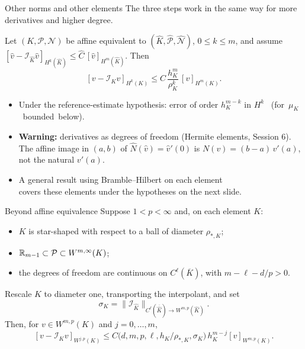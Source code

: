 \begin{frame}{Other norms and other elements}
    \small
    The three steps work in the same way for more derivatives and higher degree.
    \begin{theorem}
        Let $(K,\mathcal P,\mathcal N)$ be affine equivalent to $(\widehat K,\widehat{\mathcal P},\widehat{\mathcal N})$, $0 \le k \le m$, and assume
        $[\widehat v - \mathcal I_{\widehat K}\widehat v]_{H^k(\widehat K)} \le \widehat C\, [\widehat v]_{H^m(\widehat K)}$. Then
        \[
            [v - \mathcal I_K v]_{H^k(K)} \le C\, \frac{h_K^m}{\rho_K^k}\, [v]_{H^m(K)} .
        \]
    \end{theorem}
    \begin{itemize}
        \item Under the reference-estimate hypothesis: error of order $h_K^{m-k}$ in $H^k$ \ \mbox{(for $\mu_K$ bounded below).}
        \item \textbf{Warning:} derivatives as degrees of freedom (Hermite elements, Session 6).\\ The affine image in $(a,b)$ of $\widehat N(\widehat v) = \widehat v'(0)$ is
              $N(v) = (b-a)\, v'(a)$, not the natural $v'(a)$.
        \item A general result using Bramble--Hilbert on each element\\ covers these elements under the hypotheses on the next slide.
    \end{itemize}
\end{frame}

\begin{frame}{Beyond affine equivalence}
    \small
    Suppose $1<p<\infty$ and, on each element $K$:
    \begin{itemize}
        \item $K$ is star-shaped with respect to a ball of diameter $\rho_{*,K}$;
        \item ${\mathbb R}_{m-1} \subset \mathcal P \subset W^{m,\infty}(K)$;
        \item the degrees of freedom are continuous on $C^\ell(\overline K)$, with $m-\ell-d/p>0$.
    \end{itemize}
    Rescale $K$ to diameter one, transporting the interpolant, and set
    \[
        \sigma_K = \|\mathcal I_{\widehat K}\|_{C^\ell(\overline{\widehat K})\to W^{m,p}(\widehat K)}.
    \]
    Then, for $v\in W^{m,p}(K)$ and $j=0,\dots,m$,
    \[
        [v-\mathcal I_Kv]_{W^{j,p}(K)}
        \le C\big(d,m,p,\ell,h_K/\rho_{*,K},\sigma_K\big)\,h_K^{m-j}[v]_{W^{m,p}(K)}.
    \]
\end{frame}

